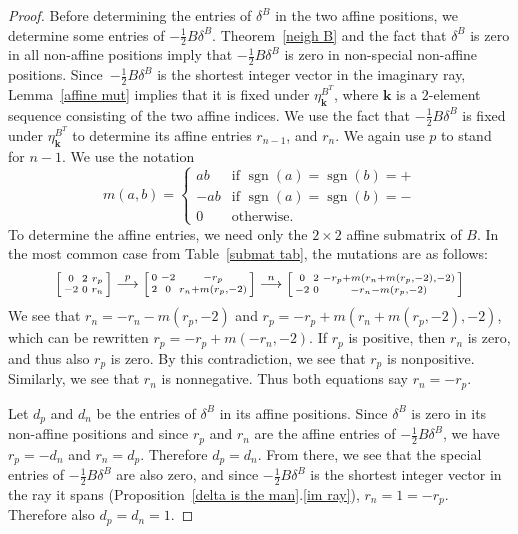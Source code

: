 \documentclass[10pt]{article}
\theoremstyle{definition}
\theoremstyle{remark}
\numberwithin{equation}{section}
\newcommand{\sgn}{\operatorname{sgn}}
\newcommand{\0}{{\mathbf{0}}}
\newcommand{\kk}{{\boldsymbol{k}}}
\begin{document}
\begin{proof}
Before determining the entries of $\delta^B$ in the two affine positions, we determine some entries of $-\frac12B\delta^B$.
Theorem~\ref{neigh B} and the fact that $\delta^B$ is zero in all non-affine positions imply that $-\frac12B\delta^B$ is zero in non-special non-affine positions.
Since~$-\frac12B\delta^B$ is the shortest integer vector in the imaginary ray, Lemma~\ref{affine mut} implies that it is fixed under $\eta^{B^T}_\kk$, where $\kk$ is a $2$-element sequence consisting of the two affine indices. 
We use the fact that $-\frac12B\delta^B$ is fixed under $\eta^{B^T}_\kk$ to determine its affine entries $r_{n-1}$, and $r_n$.
We again use $p$ to stand for $n-1$.
We use the notation 
\[m(a,b)=\begin{cases}
ab&\text{if }\sgn(a)=\sgn(b)=+\\
-ab&\text{if }\sgn(a)=\sgn(b)=-\\
0&\text{otherwise}.
\end{cases}\]
To determine the affine entries, we need only the $2\times2$ affine submatrix of $B$.
In the most common case from Table~\ref{submat tab}, the mutations are as follows:
\[
\begin{bsmallmatrix*}
0 & 2 & r_p\\
-2 & 0 & r_n
\end{bsmallmatrix*}\overset{p}{\longrightarrow}
\begin{bsmallmatrix*}
0 & -2 & -r_p\\
2 & 0 & r_n+m(r_p,-2)
\end{bsmallmatrix*}\overset{n}{\longrightarrow}
\begin{bsmallmatrix*}
0 & 2 & -r_p+m(r_n+m(r_p,-2),-2)\\
-2 & 0 & -r_n-m(r_p,-2)
\end{bsmallmatrix*}
\]
We see that $r_n=-r_n-m(r_p,-2)$ and $r_p=-r_p+m(r_n+m(r_p,-2),-2)$, which can be rewritten $r_p=-r_p+m(-r_n,-2)$.
If $r_p$ is positive, then $r_n$ is zero, and thus also $r_p$ is zero.
By this contradiction, we see that $r_p$ is nonpositive.
Similarly, we see that $r_n$ is nonnegative.
Thus both equations say $r_n=-r_p$.

Let $d_p$ and $d_n$ be the entries of $\delta^B$ in its affine positions.
Since $\delta^B$ is zero in its non-affine positions and since $r_p$ and $r_n$ are the affine entries of $-\frac12B\delta^B$, we have $r_p=-d_n$ and $r_n=d_p$.
Therefore $d_p=d_n$.
From there, we see that the special entries of $-\frac12B\delta^B$ are also zero, and since $-\frac12B\delta^B$ is the shortest integer vector in the ray it spans (Proposition~\ref{delta is the man}.\ref{im ray}), $r_n=1=-r_p$.
Therefore also $d_p=d_n=1$.


\end{proof}
\end{document}
